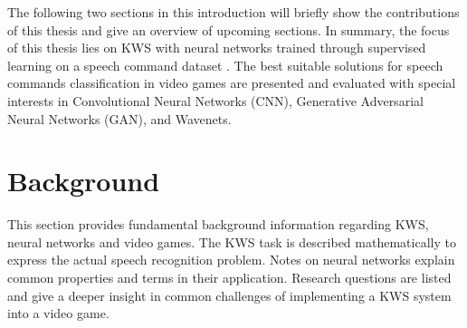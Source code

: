 The following two sections in this introduction will briefly show the contributions of this thesis and give an overview of upcoming sections.
In summary, the focus of this thesis lies on KWS with neural networks trained through supervised learning on a speech command dataset \cite{Warden2018}.
The best suitable solutions for speech commands classification in video games are presented and evaluated with special interests in Convolutional Neural Networks (CNN), Generative Adversarial Neural Networks (GAN), and Wavenets.







\chapter{Background}\label{sec:back}
This section provides fundamental background information regarding KWS, neural networks and video games.
The KWS task is described mathematically to express the actual speech recognition problem.
Notes on neural networks explain common properties and terms in their application.
Research questions are listed and give a deeper insight in common challenges of implementing a KWS system into a video game.





